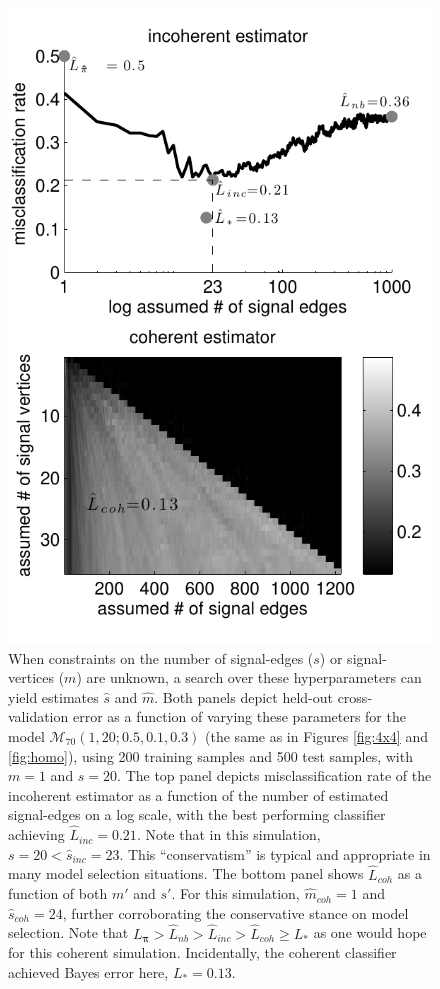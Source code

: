 \documentclass[10pt,journal,cspaper,compsoc]{IEEEtran}
\providecommand{\mc}[1]{\mathcal{#1}}
\providecommand{\mb}[1]{\boldsymbol{#1}}
\providecommand{\wh}[1]{\widehat{#1}}
\begin{document}
\begin{figure}[htbp]
	\centering
		\includegraphics[width=0.8\linewidth]{coherent_image_V70_s20_p10_q30_nTr200_nTe500.pdf}
	\caption{When constraints on the number of signal-edges ($s$) or signal-vertices ($m$) are unknown, a search over these hyperparameters can yield estimates $\wh{s}$ and $\wh{m}$.  Both panels depict held-out cross-validation error as a function of varying these parameters for the model 
	$\mc{M}_{70}(1,20;0.5,0.1,0.3)$
	(the same as in Figures \ref{fig:4x4} and \ref{fig:homo}), using 200 training samples and 500 test samples, with $m=1$ and $s=20$.  The top panel depicts misclassification rate of the incoherent estimator as a function of the number of estimated signal-edges on a log scale, with the best performing classifier achieving $\wh{L}_{inc}=0.21$. Note that in this simulation,  $s=20< \wh{s}_{inc}=23$.  This ``conservatism'' is typical and appropriate in many model selection situations.  The bottom panel shows $\wh{L}_{coh}$ as a function of both $m'$ and $s'$.  For this simulation, $\wh{m}_{coh}=1$ and $\wh{s}_{coh}=24$, further corroborating the conservative stance on model selection. Note that $L_{\mb{\pi}} > \wh{L}_{nb} > \wh{L}_{inc} > \wh{L}_{coh} \geq L_*$ as one would hope for this coherent simulation.  Incidentally, the coherent classifier achieved Bayes error here, $L_*=0.13$.}
	\label{fig:coherent}
\end{figure}
\end{document}
